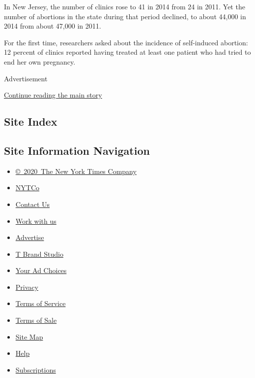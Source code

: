 In New Jersey, the number of clinics rose to 41 in 2014 from 24 in 2011.
Yet the number of abortions in the state during that period declined, to
about 44,000 in 2014 from about 47,000 in 2011.

For the first time, researchers asked about the incidence of
self-induced abortion: 12 percent of clinics reported having treated at
least one patient who had tried to end her own pregnancy.

Advertisement

\protect\hyperlink{after-bottom}{Continue reading the main story}

\hypertarget{site-index}{%
\subsection{Site Index}\label{site-index}}

\hypertarget{site-information-navigation}{%
\subsection{Site Information
Navigation}\label{site-information-navigation}}

\begin{itemize}
\tightlist
\item
  \href{https://help.nytimes.com/hc/en-us/articles/115014792127-Copyright-notice}{©~2020~The
  New York Times Company}
\end{itemize}

\begin{itemize}
\tightlist
\item
  \href{https://www.nytco.com/}{NYTCo}
\item
  \href{https://help.nytimes.com/hc/en-us/articles/115015385887-Contact-Us}{Contact
  Us}
\item
  \href{https://www.nytco.com/careers/}{Work with us}
\item
  \href{https://nytmediakit.com/}{Advertise}
\item
  \href{http://www.tbrandstudio.com/}{T Brand Studio}
\item
  \href{https://www.nytimes.com/privacy/cookie-policy\#how-do-i-manage-trackers}{Your
  Ad Choices}
\item
  \href{https://www.nytimes.com/privacy}{Privacy}
\item
  \href{https://help.nytimes.com/hc/en-us/articles/115014893428-Terms-of-service}{Terms
  of Service}
\item
  \href{https://help.nytimes.com/hc/en-us/articles/115014893968-Terms-of-sale}{Terms
  of Sale}
\item
  \href{https://spiderbites.nytimes.com}{Site Map}
\item
  \href{https://help.nytimes.com/hc/en-us}{Help}
\item
  \href{https://www.nytimes.com/subscription?campaignId=37WXW}{Subscriptions}
\end{itemize}
